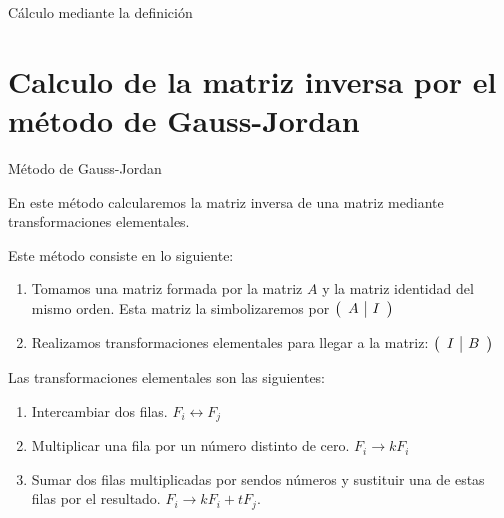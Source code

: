 \documentclass[9pt]{beamer}
\begin{document}
\begin{frame}{Cálculo mediante la definición}
\end{frame}
\section{Calculo de la matriz inversa por el método de Gauss-Jordan}

\begin{frame}{Método de Gauss-Jordan}


En este método calcularemos la matriz inversa de una matriz mediante transformaciones elementales.

\pause

Este método consiste en lo siguiente:
\pause
\begin{enumerate}[<+-|alert@+>]
\item Tomamos una matriz formada por la matriz $A$ y la matriz identidad del mismo orden. Esta matriz la simbolizaremos por $\left( \begin{array}{c | c}
A &  I 
\end{array} \right) $
\item Realizamos transformaciones elementales para llegar a la matriz: $\left( \begin{array}{c | c} I & B 
\end{array} \right) $
\end{enumerate}

\pause
Las transformaciones elementales son las siguientes:
\pause
\begin{enumerate}[<+-|alert@+>]
\item Intercambiar dos filas. $F_i \leftrightarrow F_j$
\item Multiplicar una fila por un número distinto de cero. $F_i \rightarrow kF_i$
\item Sumar dos filas multiplicadas por sendos números y sustituir una de estas filas por el resultado. $F_i \rightarrow kF_i+tF_j$.
\end{enumerate}

\end{frame}
\end{document}
